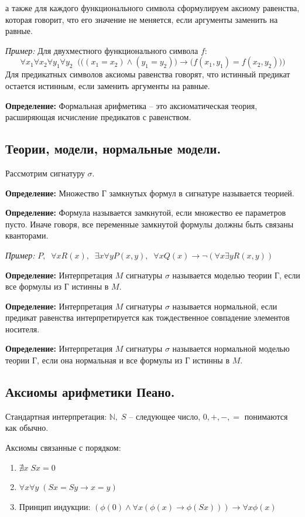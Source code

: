 \noindent а также для каждого функционального символа сформулируем аксиому равенства, которая говорит, что его значение не меняется, если аргументы заменить на равные.

\textit{Пример:} Для двухместного функционального символа $f$: $$\forall x_1 \forall x_2 \forall y_1\forall y_2\;\; \big(\big((x_1=x_2)\land(y_1=y_2)\big)\to \big(f(x_1,y_1)=f(x_2,y_2)\big)\big)$$
\noindent Для предикатных символов аксиомы равенства говорят, что истинный предикат остается истинным, если заменить аргументы на равные.

\textbf{Определение:} Формальная арифметика -- это аксиоматическая теория, расширяющая исчисление предикатов с равенством.

\subsection{Теории, модели, нормальные модели.}
Рассмотрим сигнатуру $\sigma$.

\textbf{Определение:} Множество Г замкнутых формул в сигнатуре называется теорией.

\textbf{Определение:} Формула называется замкнутой, если множество ее параметров пусто. Иначе говоря, все переменные замкнутой формулы должны быть связаны кванторами.

\textit{Пример:} $P,\;\; \forall xR(x),\;\; \exists x \forall y P(x,y),\;\; \forall x Q(x)\to \neg(\forall x \exists y R(x,y))$

\textbf{Определение:} Интерпретация $M$ сигнатуры $\sigma$ называется моделью теории Г, если все формулы из Г истинны в $M$.

\textbf{Определение:} Интерпретация $M$ сигнатуры $\sigma$ называется нормальной, если предикат равенства интерпретируется как тождественное совпадение элементов носителя.

\textbf{Определение:} Интерпретация $M$ сигнатуры $\sigma$ называется нормальной моделью теории Г, если она нормальная и все формулы из Г истинны в $M$.

\subsection{Аксиомы арифметики Пеано.}
Стандартная интерпретация: $\mathbb{N}, \; S$ -- следующее число, $0, +, -, =$ понимаются как обычно.

Аксиомы связанные с порядком:
\begin{enumerate}
    \item $\nexists x \; Sx=0 $
    \item $\forall x \forall y \; (Sx=Sy \to x = y)$
    \item Принцип индукции: $(\phi(0)\land \forall x (\phi(x)\to\phi(Sx)))\to\forall x \phi(x) $
\end{enumerate}

